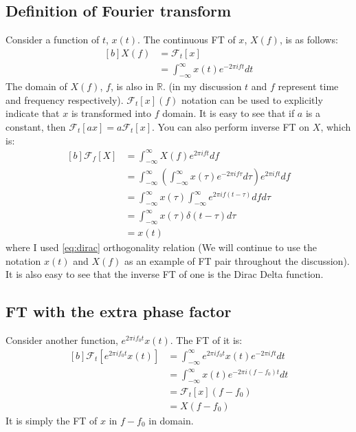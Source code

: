 \documentclass[letterpaper, 11pt]{article}
\newcommand{\fourier}[2]{\mathcal{F}_{#1}[#2]} %
\newcommand{\fint}{\int_{-\infty}^{\infty}} %
\newcommand{\ft}[3]{\fint #2 e^{-2\pi i#3#1} d#1} %
\newcommand{\ift}[3]{\fint #2 e^{2\pi i#1#3} d#1} %
\numberwithin{equation}{section}
\numberwithin{figure}{section}
\begin{document}
\subsection{Definition of Fourier transform}
Consider a function of \(t\), \(x(t)\). The continuous FT of \(x\), \(X(f)\), is as follows:
\begin{equation}
	\begin{aligned}[b]
		X(f)	&=\fourier{t}{x} \\
			&=\ft{t}{x(t)}{f}
	\end{aligned}
\end{equation}
The domain of \(X(f)\), \(f\), is also in \(\mathbb{R}\). (in my discussion \(t\) and \(f\) represent time and frequency respectively). \(\fourier{t}{x}(f)\) notation can be used to explicitly indicate that \(x\) is transformed into \(f\) domain. It is easy to see that if \(a\) is a constant, then \(\fourier{t}{ax} = a \fourier{t}{x}\). You can also perform inverse FT on \(X\), which is:
\begin{equation}
	\begin{aligned}[b]
		\fourier{f}{X}	&= \ift{f}{X(f)}{t} \\
				&= \ift{f}{\left ( \ft{\tau}{x(\tau)}{f}\right )}{t} \\
				&= \fint x(\tau) \fint e^{2\pi if(t - \tau)} df d\tau \\
				&= \fint x(\tau) \delta (t - \tau) d\tau \\
				&= x(t)
	\end{aligned}
\end{equation}
where I used \eqref{eq:dirac} orthogonality relation (We will continue to use the notation \(x(t)\) and \(X(f)\) as an example of FT pair throughout the discussion). It is also easy to see that the inverse FT of one is the Dirac Delta function.

\subsection{FT with the extra phase factor}
Consider another function, \(e^{2\pi i f_{0} t}x(t)\). The FT of it is:
\begin{equation}
	\begin{aligned}[b]
		\fourier{t}{e^{2\pi i f_{0} t}x(t)}
			&= \ft{t}{e^{2\pi i f_{0} t}x(t)}{f}\\
			&= \ft{t}{x(t)}{(f - f_{0})}\\
			&= \fourier{t}{x}(f - f_{0})\\
			&= X(f - f_{0})
	\end{aligned}
\end{equation}
It is simply the FT of \(x\) in \(f - f_{0}\) in domain.
\end{document}

